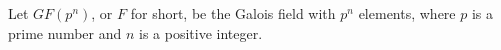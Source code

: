 
Let $GF(p^n)$, or $F$ for short, be the Galois field with $p^n$ elements, where $p$ is a prime number and $n$ is a positive integer.
